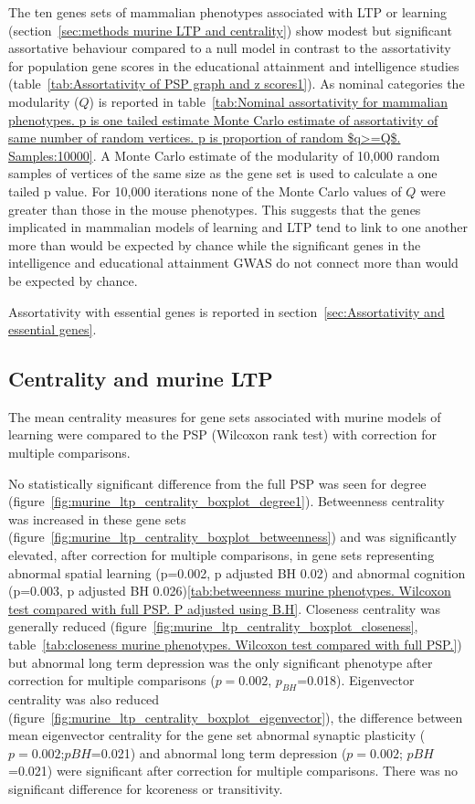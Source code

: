     The ten genes sets of mammalian phenotypes associated with LTP or learning (section~\ref{sec:methods murine LTP and centrality}) show modest but significant assortative behaviour compared to a null model in contrast to the assortativity for population gene scores in the educational attainment and intelligence studies (table~\ref{tab:Assortativity of PSP graph and z scores1}). As nominal categories the modularity ($Q$) is reported in table~\ref{tab:Nominal assortativity for mammalian phenotypes. p is one tailed estimate Monte Carlo estimate of assortativity of same number of random vertices. p is proportion of random $q>=Q$. Samples:10000}. A Monte Carlo estimate of the modularity of 10,000 random samples of vertices of the same size as the gene set is used to calculate a one tailed p value. For 10,000 iterations none of the Monte Carlo values of $Q$ were greater than those in the mouse phenotypes. This suggests that the genes implicated in mammalian models of learning and LTP tend to link to one another more than would be expected by chance while the significant genes in the intelligence and educational attainment GWAS do not connect more than would be expected by chance. 
 
 Assortativity with essential genes is reported in section~\ref{sec:Assortativity and essential genes}.
 
 
 \clearpage
 
 
\subsection{Centrality and murine LTP}
\label{sec:Centrality and murine LTP}
The mean centrality measures for gene sets associated with murine models of learning were compared to the PSP (Wilcoxon rank test) with correction for multiple comparisons. 

No statistically significant difference from the full PSP was seen for degree (figure~\ref{fig:murine_ltp_centrality_boxplot_degree1}). Betweenness centrality was  increased in these gene sets (figure~\ref{fig:murine_ltp_centrality_boxplot_betweenness}) and was significantly elevated, after correction for multiple comparisons, in gene sets representing abnormal spatial learning (p=0.002, p adjusted BH 0.02) and  abnormal cognition (p=0.003, p adjusted BH 0.026)\ref{tab:betweenness murine phenotypes. Wilcoxon test compared with full PSP. P adjusted using B.H}. Closeness centrality was generally reduced  (figure~\ref{fig:murine_ltp_centrality_boxplot_closeness}, table~\ref{tab:closeness murine phenotypes. Wilcoxon test compared with full PSP.}) but abnormal long term depression was the only significant phenotype after correction for multiple comparisons ($p=0.002$, $p_{BH}$=0.018). Eigenvector centrality was also reduced (figure~\ref{fig:murine_ltp_centrality_boxplot_eigenvector}), the difference between mean eigenvector centrality for the gene set abnormal synaptic plasticity ($p=0.002$;$p BH$=0.021) and abnormal long term depression ($p=0.002$; $p BH$=0.021) were significant after correction for multiple comparisons. There was no significant difference for kcoreness or transitivity.

